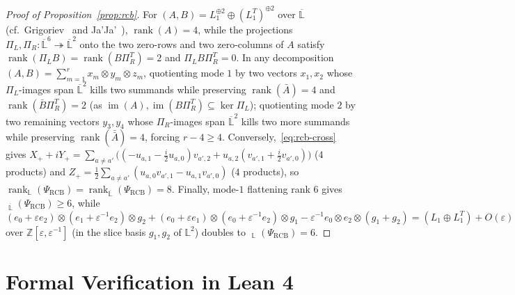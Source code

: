 \documentclass[11pt,reqno]{amsart}
\theoremstyle{definition}
\theoremstyle{remark}
\numberwithin{equation}{section}
\newcommand{\LL}{\mathbb{L}}
\newcommand{\ZZ}{\mathbb{Z}}
\DeclareMathOperator{\rk}{rank}
\DeclareMathOperator{\brk}{\underline{rank}}
\DeclareMathOperator{\im}{im}
\begin{document}
\begin{proof}[Proof of Proposition~\ref{prop:rcb}]
For $(A, B) = L_1^{\oplus 2} \oplus (L_1^T)^{\oplus 2}$ over $\overline{\LL}$ (cf.\ Grigoriev~\cite{Grigoriev1978} and Ja'Ja'~\cite{JaJa1979}), $\rk(A) = 4$, while the projections $\Pi_L, \Pi_R : \overline{\LL}^6 \twoheadrightarrow \overline{\LL}^2$ onto the two zero-rows and two zero-columns of $A$ satisfy $\rk(\Pi_L B) = \rk(B \Pi_R^T) = 2$ and $\Pi_L B \Pi_R^T = 0$. In any decomposition $(A, B) = \sum_{m=1}^r x_m \otimes y_m \otimes z_m$, quotienting mode $1$ by two vectors $x_1, x_2$ whose $\Pi_L$-images span $\overline{\LL}^2$ kills two summands while preserving $\rk(\bar{A}) = 4$ and $\rk(\bar{B}\Pi_R^T) = 2$ (as $\im(A), \im(B\Pi_R^T) \subseteq \ker\Pi_L$); quotienting mode $2$ by two remaining vectors $y_3, y_4$ whose $\Pi_R$-images span $\overline{\LL}^2$ kills two more summands while preserving $\rk(\bar{\bar{A}}) = 4$, forcing $r - 4 \ge 4$. Conversely,~\eqref{eq:rcb-cross} gives $X_+ + i Y_+ = \sum_{a \neq a'} \bigl((-u_{a,1} - \frac{i}{2}u_{a,0})v_{a',2} + u_{a,2}(v_{a',1} + \frac{i}{2}v_{a',0})\bigr)$ ($4$ products) and $Z_+ = \frac{1}{2}\sum_{a \neq a'}(u_{a,0} v_{a',1} - u_{a,1} v_{a',0})$ ($4$ products), so $\rk_{\LL}(\Psi_{\mathrm{RCB}}) = \rk_{\overline{\LL}}(\Psi_{\mathrm{RCB}}) = 8$. Finally, mode-$1$ flattening rank $6$ gives $\brk_{\overline{\LL}}(\Psi_{\mathrm{RCB}}) \ge 6$, while $(e_0 + \varepsilon e_2)\otimes(e_1 + \varepsilon^{-1}e_2)\otimes g_2 + (e_0 + \varepsilon e_1)\otimes(e_0 + \varepsilon^{-1}e_2)\otimes g_1 - \varepsilon^{-1} e_0 \otimes e_2 \otimes (g_1 + g_2) = (L_1 \oplus L_1^T) + O(\varepsilon)$ over $\ZZ[\varepsilon, \varepsilon^{-1}]$ (in the slice basis $g_1, g_2$ of $\LL^2$) doubles to $\brk_{\LL}(\Psi_{\mathrm{RCB}}) = 6$.
\end{proof}

\section{Formal Verification in Lean 4}\label{sec:lean}
\end{document}
